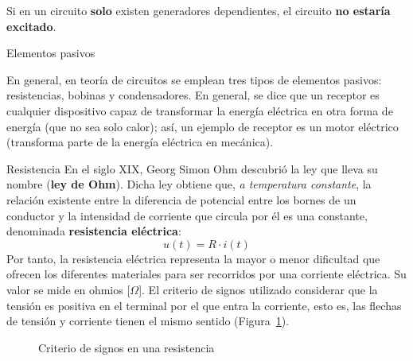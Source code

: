 \documentclass[11pt]{book} %
\makeatletter
\numberwithin{dummy}{section}
\theoremstyle{ocrenumbox}
\theoremstyle{blacknumex}
\theoremstyle{blacknumbox}
\theoremstyle{ocrenum}
\newenvironment{remark}{\par\vspace{10pt}\small %
\begin{list}{}{
\leftmargin=35pt %
\rightmargin=25pt}\item\ignorespaces %
\makebox[-2.5pt]{\begin{tikzpicture}[overlay]
\node[draw=ocre!60,line width=1pt,circle,fill=ocre!25,font=\sffamily\bfseries,inner sep=2pt,outer sep=0pt] at (-15pt,0pt){\textcolor{ocre}{N}};\end{tikzpicture}} %
\advance\baselineskip -1pt}{\end{list}\vskip5pt} %
\renewcommand{\subsection}{\@startsection {subsection}{2}{\z@}
{-3ex \@plus -0.1ex \@minus -.4ex}
{0.5ex \@plus.2ex }
{\normalfont\sffamily\bfseries}}
\renewcommand{\subsubsection}{\@startsection {subsubsection}{3}{\z@}
{-2ex \@plus -0.1ex \@minus -.2ex}
{.2ex \@plus.2ex }
{\normalfont\small\sffamily\bfseries}}
\newlength\esp
\makeatother
\begin{document}
	\begin{remark}
		Si en un circuito \textbf{solo} existen generadores dependientes, el circuito \textbf{no estaría excitado}.
	\end{remark} 
	
	
	
	
	
	\subsection{Elementos pasivos}\label{sec.elementos_pasivos}
	
	
	En general, en teoría de circuitos se emplean tres tipos de elementos pasivos: resistencias, bobinas y condensadores. En general, se dice que un receptor es cualquier dispositivo capaz de transformar la energía eléctrica en otra forma de energía (que no sea solo calor); así, un ejemplo de receptor es un motor eléctrico (transforma parte de la energía eléctrica en mecánica).  
	
	\subsubsection{Resistencia}
	En el siglo XIX, Georg Simon Ohm descubrió la ley que lleva su nombre (\textbf{ley de Ohm}). Dicha ley obtiene que, \textit{a temperatura constante}, la relación existente entre la diferencia de potencial entre los bornes de un conductor y la intensidad de corriente que circula por él es una constante, denominada \textbf{resistencia eléctrica}:
	\begin{equation*}
		\boxed{u(t)=R\cdot i(t)}
	\end{equation*}
	Por tanto, la resistencia eléctrica representa la mayor o menor dificultad que ofrecen los diferentes materiales para ser recorridos por una corriente eléctrica. Su valor se mide en ohmios [$\Omega$]. El criterio de signos utilizado considerar que la tensión es positiva en el terminal por el que entra la corriente, esto es, las flechas de tensión y corriente tienen el mismo sentido (Figura~\ref{fig.resistencia}).
	\begin{figure}[htbp]
		\centering
		\hfil
		\caption{Criterio de signos en una resistencia}
		\label{fig.resistencia}
	\end{figure}
	
\end{document}
